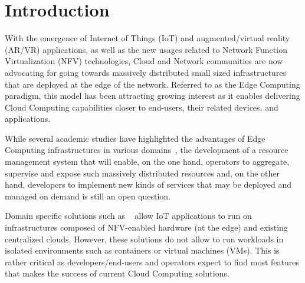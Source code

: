 
\section{Introduction}
\label{sec:intro}


With the emergence of Internet of Things (IoT) and augmented/virtual reality (AR/VR) 
applications, as well as the new usages related to Network Function
Virtualization (NFV) technologies, Cloud and Network communities are now advocating
for going towards massively distributed small sized infrastructures
that are deployed at the edge of the network.
%
Referred to as the Edge Computing paradigm, this model has been attracting
growing interest as it enables delivering Cloud
Computing capabilities closer to end-users, their related devices, and applications.
%

While several academic studies have highlighted the advantages of Edge
Computing infrastructures in various
domains~\cite{bonomi2012fog,zhang2015cloud,yi2015fog,shi2016edge,satyanarayanan2017emergence},
the development of
a resource management system that will enable, on the one hand,
operators to aggregate, supervise and expose such massively
distributed resources and, on the other hand, developers to implement
new kinds of services that may be deployed and managed on demand is
still an open question.

Domain specific solutions such as ~\cite{bonomi2012fog} allow IoT applications 
to run on infrastructures composed of NFV-enabled hardware (at the edge) and
existing centralized clouds. However, these solutions do not allow to
run workloads in isolated environments such as containers or virtual
machines (VMs). 
%
This is rather critical as developers/end-users and operators expect to find
most features that makes the success of current Cloud Computing solutions.

